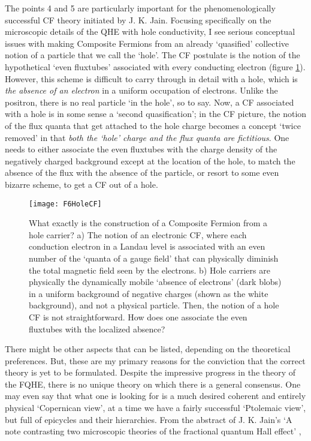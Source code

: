 \documentclass[aps,preprint,12pt,tightenlines]{revtex4}%
\begin{document}
The points 4 and 5 are particularly important for the phenomenologically
successful CF theory initiated by J. K. Jain. Focusing specifically on the microscopic details of the QHE with hole conductivity, I see serious conceptual issues with making Composite
Fermions from an already `quasified' collective notion of a particle that we
call the `hole'. The CF postulate is the notion of the hypothetical `even fluxtubes'
associated with every conducting electron (figure \ref{fig:holecf}). However, this
scheme is difficult to carry through in detail with a hole, which is\emph{ the absence of an
electron} in a uniform occupation of electrons. Unlike the positron, there is
no real particle `in the hole', so to say. Now, a CF associated with a hole is
in some sense a `second quasification'; in the CF picture, the notion of the
flux quanta that get attached to the hole charge becomes a concept `twice
removed' in that \emph{both the `hole' charge and the flux quanta are
fictitious}. One needs to either associate the even fluxtubes with the charge
density of the negatively charged background except at the location of the
hole, to match the absence of the flux with the absence of the particle, or
resort to some even bizarre scheme, to get a CF out of a hole.

\begin{figure}
	\centering
	\texttt{[image: F6HoleCF]}
	\caption{What exactly is the construction of a Composite Fermion from a hole
		carrier? a) The notion of an electronic CF, where each conduction electron in
		a Landau level is associated with an even number of the `quanta of a gauge
		field' that can physically diminish the total magnetic field seen by the
		electrons. b) Hole carriers are physically the dynamically mobile `absence of
		electrons' (dark blobs) in a uniform background of negative charges (shown as
		the white background), and not a physical particle. Then, the notion of a hole
		CF is not straightforward. How does one associate the even fluxtubes with the
		localized absence? }
	\label{fig:holecf}
\end{figure}


There might be other aspects that can be listed, depending on the theoretical
preferences. But, these are my primary reasons for the conviction that the
correct theory is yet to be formulated. Despite the impressive progress in the
theory of the FQHE, there is no unique theory on which there is a general
consensus. One may even say that what one is looking for is a much desired
coherent and entirely physical `Copernican view', at a time we have a fairly
successful `Ptolemaic view', but full of epicycles and their hierarchies. From
the abstract of J. K. Jain's `A note contrasting two microscopic theories of
the fractional quantum Hall effect' \cite{Jain-IndianJl},
\end{document}
